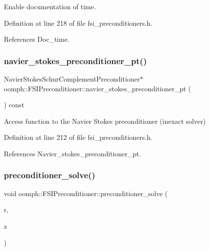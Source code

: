 Enable documentation of time. 



Definition at line 218 of file fsi\+\_\+preconditioners.\+h.



References Doc\+\_\+time.

\mbox{\label{classoomph_1_1FSIPreconditioner_a8cd1be6bffd5014090350064177c0283}} 
\subsubsection{\texorpdfstring{navier\+\_\+stokes\+\_\+preconditioner\+\_\+pt()}{navier\_stokes\_preconditioner\_pt()}}
{\footnotesize\ttfamily Navier\+Stokes\+Schur\+Complement\+Preconditioner$\ast$ oomph\+::\+F\+S\+I\+Preconditioner\+::navier\+\_\+stokes\+\_\+preconditioner\+\_\+pt (\begin{DoxyParamCaption}{ }\end{DoxyParamCaption}) const\hspace{0.3cm}{\ttfamily [inline]}}



Access function to the Navier Stokes preconditioner (inexact solver) 



Definition at line 212 of file fsi\+\_\+preconditioners.\+h.



References Navier\+\_\+stokes\+\_\+preconditioner\+\_\+pt.

\mbox{\label{classoomph_1_1FSIPreconditioner_a31c84c3ca19c31488acd0bf2fe333a6b}} 
\subsubsection{\texorpdfstring{preconditioner\+\_\+solve()}{preconditioner\_solve()}}
{\footnotesize\ttfamily void oomph\+::\+F\+S\+I\+Preconditioner\+::preconditioner\+\_\+solve (\begin{DoxyParamCaption}\item[{const Double\+Vector \&}]{r,  }\item[{Double\+Vector \&}]{z }\end{DoxyParamCaption})}



